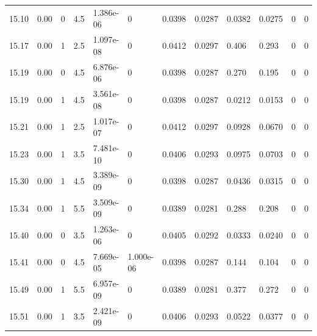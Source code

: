 \documentclass[preview]{standalone}
\begin{document}
{{{{{{{{{{\begin{tabular}{L{1.2cm}C{1.2cm} C{0.3cm}C{0.5cm} C{1.4cm}C{1.4cm} C{1.4cm}C{1.4cm} C{1.6cm}C{1.6cm} C{1.6cm}C{1.6cm}}
  15.10  &  0.00  & 0     & 4.5 &  1.386e-06  & 0  &  0.0398&   0.0287& 0.0382 & 0.0275   &  0 & 0  \\ 
  15.17  &  0.00  & 1     & 2.5 &  1.097e-08  & 0  &  0.0412&   0.0297& 0.406 & 0.293   &  0 & 0  \\ 
  15.19  &  0.00  & 0     & 4.5 &  6.876e-06  & 0  &  0.0398&   0.0287& 0.270 & 0.195   &  0 & 0  \\ 
  15.19  &  0.00  & 1     & 4.5 &  3.561e-08  & 0  &  0.0398&   0.0287& 0.0212 & 0.0153   &  0 & 0  \\ 
  15.21  &  0.00  & 1     & 2.5 &  1.017e-07  & 0  &  0.0412&   0.0297& 0.0928 & 0.0670   &  0 & 0  \\ 
  15.23  &  0.00  & 1     & 3.5 &  7.481e-10  & 0  &  0.0406&   0.0293& 0.0975 & 0.0703   &  0 & 0  \\ 
  15.30  &  0.00  & 1     & 4.5 &  3.389e-09  & 0  &  0.0398&   0.0287& 0.0436 & 0.0315   &  0 & 0  \\ 
  15.34  &  0.00  & 1     & 5.5 &  3.509e-09  & 0  &  0.0389&   0.0281& 0.288 & 0.208   &  0 & 0  \\ 
  15.40  &  0.00  & 0     & 3.5 &  1.263e-06  & 0  &  0.0405&   0.0292& 0.0333 & 0.0240   &  0 & 0  \\ 
  15.41  &  0.00  & 0     & 4.5 &  7.669e-05  & 1.000e-06  &  0.0398&   0.0287& 0.144 & 0.104   &  0 & 0  \\ 
  15.49  &  0.00  & 1     & 5.5 &  6.957e-09  & 0  &  0.0389&   0.0281& 0.377 & 0.272   &  0 & 0  \\ 
  15.51  &  0.00  & 1     & 3.5 &  2.421e-09  & 0  &  0.0406&   0.0293& 0.0522 & 0.0377   &  0 & 0  \\ 
\hline 
\end{tabular} 

}}}}}}}}}}
\end{document}
